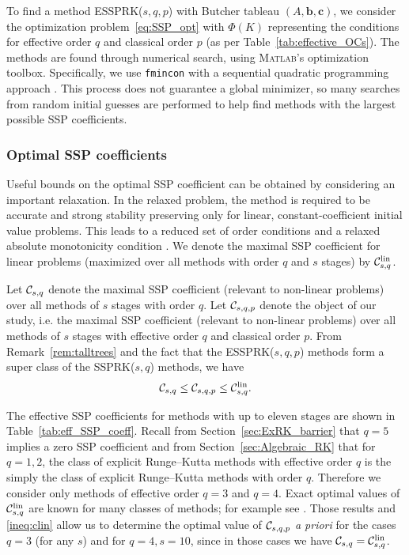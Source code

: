 \documentclass[final]{siamltex}  %
\begin{document}
To find a method ESSPRK($s,q,p$) with Butcher tableau $(A, \bm{b},
\bm{c})$, we consider the optimization problem~\eqref{eq:SSP_opt} 
with $\Phi(K)$ representing the conditions for effective order
$q$ and classical order $p$ (as per Table~\ref{tab:effective_OCs}).
The methods are found through numerical search, using 
\textsc{Matlab}'s optimization toolbox.
Specifically, we use \texttt{fmincon} with a sequential quadratic 
programming approach \cite{Ketcheson2008, Ketcheson/Macdonald/Gottlieb:2009}.
This process does not guarantee a global minimizer, so many searches 
from random initial guesses are performed to help
find methods with the largest possible SSP coefficients.

\subsubsection{Optimal SSP coefficients}\label{subsubsec:optimal_SSP_coeff}
Useful bounds on the optimal SSP coefficient can be obtained 
by considering an important relaxation. 
In the relaxed problem, the method is required to be accurate and strong 
stability preserving only for linear, constant-coefficient initial value problems. 
This leads to a reduced set of order conditions and a relaxed absolute 
monotonicity condition \cite{Kraaijevanger1986,Ketcheson2008,ketcheson2009a}.
We denote the maximal SSP coefficient for linear problems
(maximized over all methods with order $q$ and $s$ stages) by $\mathcal{C}^{\textnormal{lin}}_{s,q}$.

Let $\mathcal{C}_{s,q}$ denote the maximal SSP coefficient (relevant to
non-linear problems) over all methods of $s$ stages with order $q$.  Let
$\mathcal{C}_{s,q,p}$ denote the object of our study, i.e. the maximal SSP
coefficient (relevant to non-linear problems) over all methods of $s$ stages
with effective order $q$ and classical order $p$.
From Remark~\ref{rem:talltrees} and the fact that the ESSPRK($s,q,p$) methods
form a super class of the SSPRK($s,q$) methods, we have
\begin{align} \label{ineq:clin}
        \mathcal{C}_{s,q} \le \mathcal{C}_{s,q,p} \le\mathcal{C}^{\textnormal{lin}}_{s,q}.
\end{align}

The effective SSP coefficients for methods with up to eleven stages are shown in 
Table~\ref{tab:eff_SSP_coeff}.
Recall from Section~\ref{sec:ExRK_barrier} that $q=5$ implies a zero
SSP coefficient and from Section~\ref{sec:Algebraic_RK} that for
$q=1,2$, the class of explicit Runge--Kutta methods with effective order $q$
is the simply the class of explicit Runge--Kutta methods with order $q$.  %
Therefore we consider only methods of effective order $q=3$ and $q=4$.
Exact optimal values of $\mathcal{C}^{\textnormal{lin}}_{s,q}$ are known for many classes of methods; for
example see \cite{Kraaijevanger1986,Ketcheson2008,ketcheson2009a}.
Those results and \eqref{ineq:clin} allow us to determine the optimal value
of $\mathcal{C}_{s,q,p}$ {\em a priori} for the cases $q=3$ (for any $s$) and
for $q=4,s=10$, since in those cases we have $\mathcal{C}_{s,q}=\mathcal{C}^{\textnormal{lin}}_{s,q}$.
\end{document}

